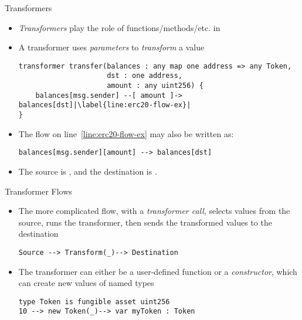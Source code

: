 \documentclass[leqno,presentation,usenames,dvipsnames]{beamer}
\begin{document}
\begin{frame}[fragile]{Transformers}
    \begin{itemize}
        \item \emph{Transformers} play the role of functions/methods/etc. in \langName
        \item A transformer uses \emph{parameters} to \emph{transform} a value
\begin{lstlisting}[language=flow, xleftmargin=-0.4em, basicstyle=\scriptsize\ttfamily]
transformer transfer(balances : any map one address => any Token,
                     dst : one address,
                     amount : any uint256) {
    balances[msg.sender] --[ amount ]-> balances[dst]|\label{line:erc20-flow-ex}|
}
\end{lstlisting}
        \item The flow on line~\ref{line:erc20-flow-ex} may also be written as:
\begin{lstlisting}[language=flow, xleftmargin=-0.4em, basicstyle=\scriptsize\ttfamily]
balances[msg.sender][amount] --> balances[dst]
\end{lstlisting}
        \item The source is , and the destination is .
    \end{itemize}
\end{frame}

\begin{frame}[fragile]{Transformer Flows}
    \begin{itemize}
        \item The more complicated flow, with a \emph{transformer call}, selects values from the source, runs the transformer, then sends the transformed values to the destination
\begin{lstlisting}[language=flow, xleftmargin=-0.4em, basicstyle=\footnotesize\ttfamily]
Source --> Transform(_)--> Destination
\end{lstlisting}
        \item The transformer can either be a user-defined function or a \emph{constructor}, which can create new values of named types
\begin{lstlisting}[language=flow, xleftmargin=-0.4em, basicstyle=\footnotesize\ttfamily]
type Token is fungible asset uint256
10 --> new Token(_)--> var myToken : Token
\end{lstlisting}
    \end{itemize}
\end{frame}
\end{document}
